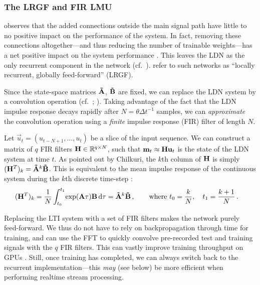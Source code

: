 \subsubsection{The LRGF and FIR LMU}
 observes that the added connections outside the main signal path have little to no positive impact on the performance of the system.
In fact, removing these connections altogether---and thus reducing the number of trainable weights---has a net positive impact on the system performance \citep{chilkuri2021parallelizing}.
This leaves the LDN as the only recurrent component in the network (cf.~).
 refer to such networks as \enquote{locally recurrent, globally feed-forward} (LRGF).

Since the state-space matrices $\mathbf{\tilde A}$, $\mathbf{\tilde B}$ are fixed, we can replace the LDN system by a convolution operation (cf.~; \cite{chilkuri2021parallelizing}).
Taking advantage of the fact that the LDN impulse response decays rapidly after $N = \theta \Delta t^{-1}$ samples, we can \emph{approximate} the convolution operation using a \emph{finite} impulse response (FIR) filter of length $N$.

Let $\vec u_t = (u_{t - N + 1}, \ldots, u_t)$ be a slice of the input sequence.
We can construct a matrix of $q$ FIR filters $\mathbf{H} \in \mathbb{R}^{q \times N}$, such that $\mathbf{m}_t \approx \mathbf{H} \mathbf{u}_t$ is the state of the LDN system at time $t$.
As pointed out by Chilkuri, the $k$th column of $\mathbf{H}$ is simply $(\mathbf{H}^T)_k = \mathbf{\tilde A}^k \mathbf{\tilde B}$.
This is equivalent to the mean impulse response of the continuous system during the $k$th discrete time-step \citep[cf.][]{stockel2021discrete}:
\begin{align}
	(\mathbf{H}^T)_k
		&= \frac{1}N \int_{t_0}^{t_1} \! \exp(\mathbf{A} \tau) \mathbf{B} \,\mathrm{d}\tau =  \mathbf{\tilde A}^k \mathbf{\tilde B} \,, \quad\quad \text{where } t_0 = \frac{k}{N}, \quad t_1 = \frac{k + 1}{N} \,.
	\label{eqn:ldn_h_matrix}
\end{align}

Replacing the LTI system with a set of FIR filters makes the network purely feed-forward.
We thus do not have to rely on backpropagation through time \citep[e.g.,][]{werbos1990backpropagation} for training, and can use the FFT to quickly convolve pre-recorded test and training signals with the $q$ FIR filters.
This can vastly improve training throughput on GPUs \citep{chilkuri2021parallelizing}.
Still, once training has completed, we can always switch back to the recurrent implementation---this \emph{may} (see below) be more efficient when performing realtime stream processing.

